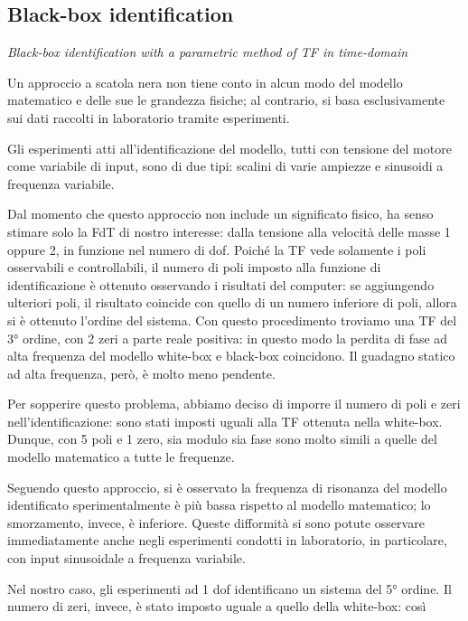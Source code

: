 \subsection{Black-box identification}

\textit{Black-box identification with a parametric method of TF in time-domain}
\\ \par Un approccio a scatola nera non tiene conto in alcun modo del modello matematico e delle sue le grandezza fisiche; al contrario, si basa esclusivamente sui dati raccolti in laboratorio tramite esperimenti.

Gli esperimenti atti all'identificazione del modello, tutti con tensione del motore come variabile di input, sono di due tipi: scalini di varie ampiezze e sinusoidi a frequenza variabile. 

Dal momento che questo approccio non include un significato fisico, ha senso stimare solo la FdT di nostro interesse: dalla tensione alla velocità delle masse 1 oppure 2, in funzione nel numero di dof. Poiché la TF vede solamente i poli osservabili e controllabili, il numero di poli imposto alla funzione di identificazione è ottenuto osservando i risultati del computer: se aggiungendo ulteriori poli, il risultato coincide con quello di un numero inferiore di poli, allora si è ottenuto l'ordine del sistema.
Con questo procedimento troviamo una TF del 3° ordine, con 2 zeri a parte reale positiva: in questo modo la perdita di fase ad alta frequenza del modello white-box e black-box coincidono. Il guadagno statico ad alta frequenza, però, è molto meno pendente.

Per sopperire questo problema, abbiamo deciso di imporre il numero di poli e zeri nell'identificazione: sono stati imposti uguali alla TF ottenuta nella white-box. Dunque, con 5 poli e 1 zero, sia modulo sia fase sono molto simili a quelle del modello matematico a tutte le frequenze.

Seguendo questo approccio, si è osservato la frequenza di risonanza del modello identificato sperimentalmente è più bassa rispetto al modello matematico; lo smorzamento, invece, è inferiore.
Queste difformità si sono potute osservare immediatamente anche negli esperimenti condotti in laboratorio, in particolare, con input sinusoidale a frequenza variabile.

Nel nostro caso, gli esperimenti ad 1 dof identificano un sistema del 5° ordine.
Il numero di zeri, invece, è stato imposto uguale a quello della white-box: così 

